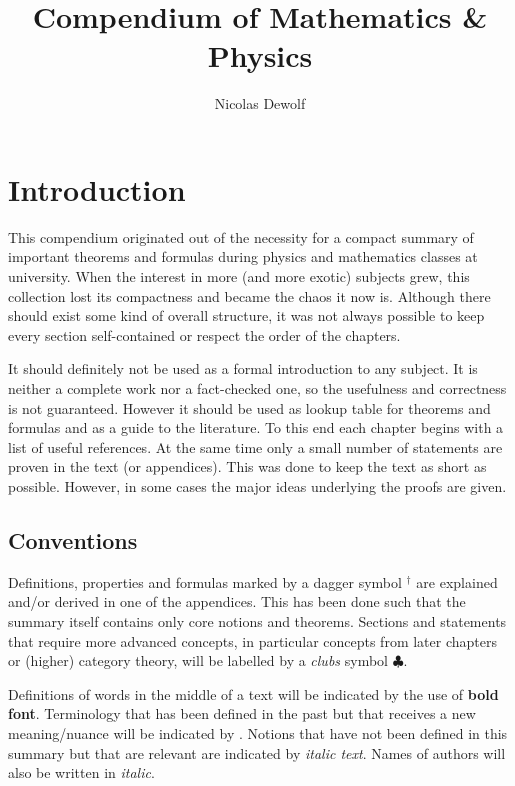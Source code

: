 \documentclass[11pt, a4paper]{report}
\begin{document}
\reversemarginpar
\setcounter{tocdepth}{2}

\title{Compendium of Mathematics \& Physics}
\author{Nicolas Dewolf}
\maketitle

\tableofcontents

\chapter{Introduction}

    This compendium originated out of the necessity for a compact summary of important theorems and formulas during physics and mathematics classes at university. When the interest in more (and more exotic) subjects grew, this collection lost its compactness and became the chaos it now is. Although there should exist some kind of overall structure, it was not always possible to keep every section self-contained or respect the order of the chapters.

    It should definitely not be used as a formal introduction to any subject. It is neither a complete work nor a fact-checked one, so the usefulness and correctness is not guaranteed. However it should be used as lookup table for theorems and formulas and as a guide to the literature. To this end each chapter begins with a list of useful references. At the same time only a small number of statements are proven in the text (or appendices). This was done to keep the text as short as possible. However, in some cases the major ideas underlying the proofs are given.

\section{Conventions}

    Definitions, properties and formulas marked by a dagger symbol $^\dag$ are explained and/or derived in one of the appendices. This has been done such that the summary itself contains only core notions and theorems. Sections and statements that require more advanced concepts, in particular concepts from later chapters or (higher) category theory, will be labelled by a \textit{clubs} symbol $\clubsuit$.

    Definitions of words in the middle of a text will be indicated by the use of \textbf{bold font}. Terminology that has been defined in the past but that receives a new meaning/nuance will be indicated by . Notions that have not been defined in this summary but that are relevant are indicated by \textit{italic text}. Names of authors will also be written in \textit{italic}.
\end{document}

